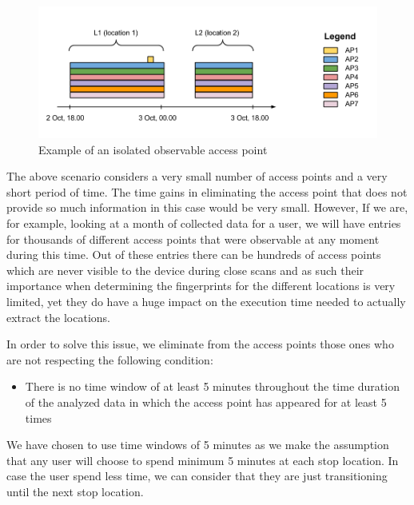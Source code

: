 \begin{figure}[ht]
\centering
\includegraphics[height = 0.35\textwidth]{figures/isolated_ap.png}
\caption{Example of an isolated observable access point}
\label{isolated_ap}
\end{figure}

The above scenario considers a very small number of access points and a very
short period of time. The time gains in eliminating the access point that does
not provide so much information in this case would be very small. However, If we
are, for example, looking at a month of collected data for a user, we will have
entries for thousands of different access points that were observable at any
moment during this time. Out of these entries there can be hundreds of access
points which are never visible to the device during close scans and as such
their importance when determining the fingerprints for the different locations
is very limited, yet they do have a huge impact on the execution time needed to
actually extract the locations.

In order to solve this issue, we eliminate from the access points those ones who
are not respecting the following condition:
\begin{itemize}
  \item There is no time window of at least 5 minutes throughout the time
  duration of the analyzed data in which the access point has appeared for at
  least 5 times
\end{itemize}

We have chosen to use time windows of 5 minutes as we make the assumption that
any user will choose to spend minimum 5 minutes at each stop location. In case
the user spend less time, we can consider that they are just transitioning until
the next stop location.
